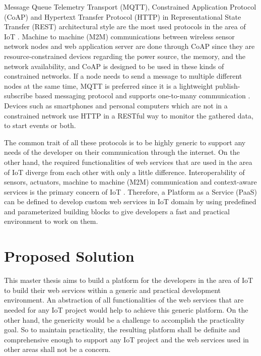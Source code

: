  Message Queue Telemetry Transport (MQTT), Constrained Application Protocol (CoAP) and Hypertext Transfer Protocol (HTTP) in Representational State Transfer (REST) architectural style are the most used protocols in the area of IoT \cite{8246418,8070130}. Machine to machine (M2M) communications between wireless sensor network nodes and web application server are done through CoAP since they are resource-constrained devices regarding the power source, the memory, and the network availability, and CoAP is designed to be used in these kinds of constrained networks. If a node needs to send a message to multiple different nodes at the same time, MQTT is preferred since it is a lightweight publish-subscribe based messaging protocol and supports one-to-many communication \cite{mqtt}. Devices such as smartphones and personal computers which are not in a constrained network use HTTP in a RESTful way to monitor the gathered data, to start events or both.

 The common trait of all these protocols is to be highly generic to support any needs of the developer on their communication through the internet. On the other hand, the required functionalities of web services that are used in the area of IoT diverge from each other with only a little difference. Interoperability of sensors, actuators, machine to machine (M2M) communication and context-aware services is the primary concern of IoT \cite{6651222}. Therefore, a Platform as a Service (PaaS) can be defined to develop custom web services in IoT domain by using predefined and parameterized building blocks to give developers a fast and practical environment to work on them.

\section{Proposed Solution}

This master thesis aims to build a platform for the developers in the area of IoT to build their web services within a generic and practical development environment. An abstraction of all functionalities of the web services that are needed for any IoT project would help to achieve this generic platform. On the other hand, the genericity would be a challenge to accomplish the practicality goal. So to maintain practicality, the resulting platform shall be definite and comprehensive enough to support any IoT project and the web services used in other areas shall not be a concern. 

